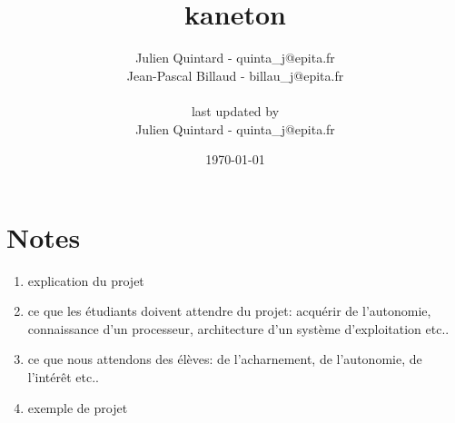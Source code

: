 \documentclass[10pt,a4wide]{article}
\title{kaneton}
\author{Julien Quintard - \small{quinta\_j@epita.fr} \\
        Jean-Pascal Billaud - \small{billau\_j@epita.fr} \\ \\
	\small{last updated by} \\
	Julien Quintard - \small{quinta\_j@epita.fr}}
\date{\today}
\begin{document}
\maketitle

\section{Notes}

\begin{enumerate}

\item explication du projet

\item ce que les \'etudiants doivent attendre du projet: acqu\'erir de
      l'autonomie, connaissance d'un processeur, architecture d'un syst\`eme
      d'exploitation etc..

\item ce que nous attendons des \'el\`eves: de l'acharnement, de l'autonomie,
      de l'int\'er\^et etc..

\item exemple de projet

\end{enumerate}
\end{document}
